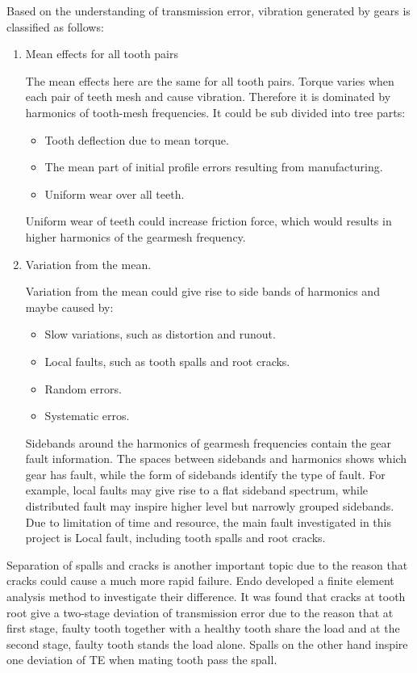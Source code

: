 Based on the understanding of transmission error, vibration generated by gears is classified as follows: \cite{vbcm}
\begin{enumerate}
\item Mean effects for all tooth pairs

The mean effects here are the same for all tooth pairs. Torque varies when each pair of teeth mesh and cause vibration. Therefore it is dominated by harmonics of tooth-mesh frequencies. It could be sub divided into tree parts: 
\begin{itemize}
\item Tooth deflection due to mean torque.		
\item The mean part of initial profile errors resulting from manufacturing.		
\item Uniform wear over all teeth.
\end{itemize}
Uniform wear of teeth could increase friction force, which would results in higher harmonics of the gearmesh frequency.

\item Variation from the mean.

Variation from the mean could give rise to side bands of harmonics and maybe caused by:
\begin{itemize}
\item Slow variations, such as distortion and runout.		
\item Local faults, such as tooth spalls and root cracks.		
\item Random errors.		
\item Systematic erros.
\end{itemize}
Sidebands around the harmonics of gearmesh frequencies contain the gear fault information. The spaces between sidebands and harmonics shows which gear has fault, while the form of sidebands identify the type of fault. For example, local faults may give rise to a flat sideband spectrum, while distributed fault may inspire higher level but narrowly grouped sidebands. 
Due to limitation of time and resource, the main fault investigated in this project is Local fault, including tooth spalls and root cracks.
\end{enumerate}

Separation of spalls and cracks is another important topic due to the reason that cracks could cause a much more rapid failure. Endo\cite{Endo} developed a finite element analysis method to investigate their difference. It was found that cracks at tooth root give a two-stage deviation of transmission error due to the reason that at first stage, faulty tooth together with a healthy tooth share the load and at the second stage, faulty tooth stands the load alone. Spalls on the other hand inspire one deviation of TE when mating tooth pass the spall. 

